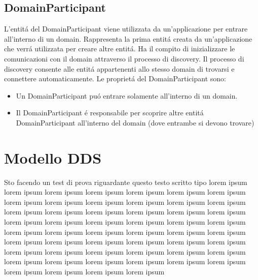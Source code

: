 \subsection{DomainParticipant}
L'entitá del DomainParticipant viene utilizzata da un'applicazione
per entrare all'interno di un domain. 
Rappresenta la prima entitá creata da un'applicazione che verrá 
utilizzata per creare altre entitá. Ha il compito di inizializzare
le comunicazioni con il domain attraverso il processo di discovery.
Il processo di discovery consente alle entitá appartenenti allo 
stesso domain di trovarsi e connettere automaticamente.
Le proprietá del DomainParticipant sono:
\begin{itemize}
    \item Un DomainParticipant puó entrare solamente all'interno
    di un domain.
    \item Il DomainParticipant é responsabile per scoprire altre
    entitá DomainParticipant all'interno del domain (dove entrambe
    si devono trovare)
\end{itemize}\cite{domainparticipantrti}




\section{Modello DDS}
Sto facendo un test di prova riguardante questo testo scritto
tipo lorem ipsum lorem ipsum lorem ipsum lorem ipsum lorem ipsum
lorem ipsum lorem ipsum lorem ipsum lorem ipsum lorem ipsum lorem ipsum
lorem ipsum lorem ipsum lorem ipsum lorem ipsum lorem ipsum lorem ipsum
lorem ipsum lorem ipsum lorem ipsum lorem ipsum lorem ipsum lorem ipsum
lorem ipsum lorem ipsum lorem ipsum lorem ipsum lorem ipsum lorem ipsum
lorem ipsum lorem ipsum lorem ipsum lorem ipsum lorem ipsum lorem ipsum
lorem ipsum lorem ipsum lorem ipsum lorem ipsum lorem ipsum lorem ipsum
lorem ipsum lorem ipsum lorem ipsum lorem ipsum lorem ipsum lorem ipsum
lorem ipsum lorem ipsum lorem ipsum lorem ipsum lorem ipsum lorem ipsum